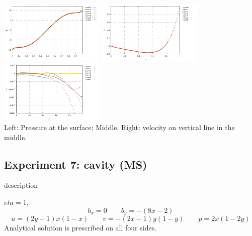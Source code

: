 \begin{center}
\includegraphics[width=5cm]{python_codes/fieldstone_78/results/pressure_top_exp6.pdf}
\includegraphics[width=5cm]{python_codes/fieldstone_78/results/vx_profile_exp6.pdf}
\includegraphics[width=5cm]{python_codes/fieldstone_78/results/vy_profile_exp6.pdf}\\
{\captionfont Left: Pressure at the surface; Middle, Right: velocity on vertical line in the middle.}
\end{center}








\newpage
\subsection*{Experiment 7: cavity (MS)}

{\color{red} description}

$eta=1$, 
\[
b_x=0 \qquad b_y=-(8x-2)
\]
\[
u=(2y-1)x(1-x)
\qquad
v=-(2x-1)y(1-y)
\qquad
p=2x(1-2y)
\]
Analytical solution is prescribed on all four sides.

